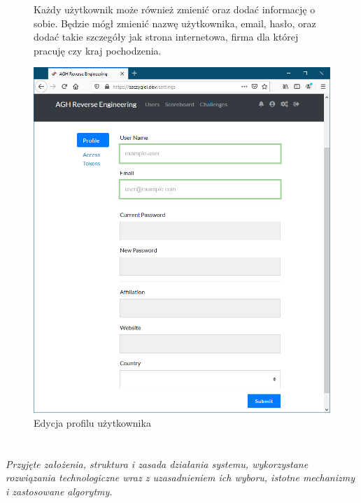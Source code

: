 \documentclass[polish,12pt]{aghthesis}
\begin{document}
\begin{figure}[ht]
    Każdy użytkownik może również zmienić oraz dodać informację o sobie.
    Będzie mógł zmienić nazwę użytkownika, email, hasło, oraz dodać
    takie szczegóły jak strona internetowa, firma dla której pracuję czy kraj pochodzenia.

    \vspace{1cm}

    \centering
    \includegraphics[width=14cm]{szczygiel_dev_settings}
    \caption{Edycja profilu użytkownika}
    \label{fig:szczygiel_dev_settings}
\end{figure}

\clearpage

\section{\SectionTitleRealizationAspects}
\label{sec:wybrane-aspekty-realizacji}
\emph{Przyjęte założenia, struktura i zasada działania systemu,
    wykorzystane rozwiązania technologiczne wraz z uzasadnieniem
    ich wyboru, istotne mechanizmy i zastosowane algorytmy.}
\end{document}
